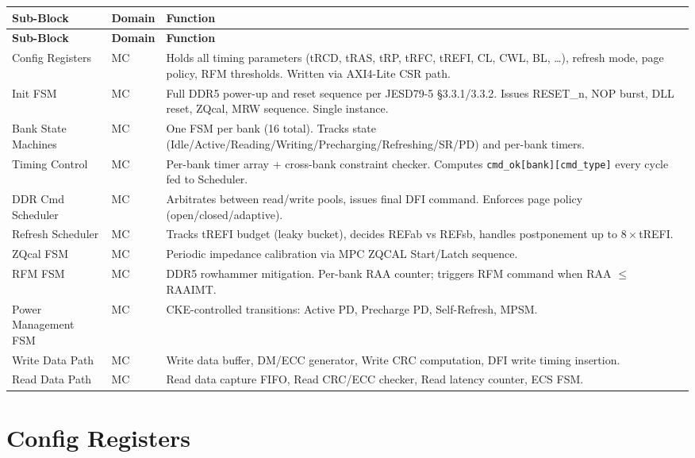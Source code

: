 \documentclass[11pt,a4paper]{article}
\begin{document}
\begin{longtable}{L{3.2cm} L{2cm} L{9.3cm}}
\toprule
\textbf{Sub-Block} & \textbf{Domain} & \textbf{Function} \\
\midrule
\endfirsthead\toprule\textbf{Sub-Block}&\textbf{Domain}&\textbf{Function}\\\midrule\endhead\bottomrule\endfoot
{}
Config Registers     & MC & Holds all timing parameters (tRCD, tRAS, tRP, tRFC, tREFI, CL, CWL, BL, \ldots), refresh mode, page policy, RFM thresholds. Written via AXI4-Lite CSR path. \\
Init FSM             & MC & Full DDR5 power-up and reset sequence per JESD79-5 §3.3.1/3.3.2. Issues RESET\_n, NOP burst, DLL reset, ZQcal, MRW sequence. Single instance. \\
Bank State Machines  & MC & One FSM per bank (16 total). Tracks state (Idle/Active/Reading/Writing/Precharging/Refreshing/SR/PD) and per-bank timers. \\
Timing Control       & MC & Per-bank timer array + cross-bank constraint checker. Computes \texttt{cmd\_ok[bank][cmd\_type]} every cycle fed to Scheduler. \\
DDR Cmd Scheduler    & MC & Arbitrates between read/write pools, issues final DFI command. Enforces page policy (open/closed/adaptive). \\
Refresh Scheduler    & MC & Tracks tREFI budget (leaky bucket), decides REFab vs REFsb, handles postponement up to $8\times$tREFI. \\
ZQcal FSM            & MC & Periodic impedance calibration via MPC ZQCAL Start/Latch sequence. \\
RFM FSM              & MC & DDR5 rowhammer mitigation. Per-bank RAA counter; triggers RFM command when RAA $\leq$ RAAIMT. \\
Power Management FSM & MC & CKE-controlled transitions: Active PD, Precharge PD, Self-Refresh, MPSM. \\
Write Data Path      & MC & Write data buffer, DM/ECC generator, Write CRC computation, DFI write timing insertion. \\
Read Data Path       & MC & Read data capture FIFO, Read CRC/ECC checker, Read latency counter, ECS FSM. \\
\end{longtable}

\section{Config Registers}
\end{document}
